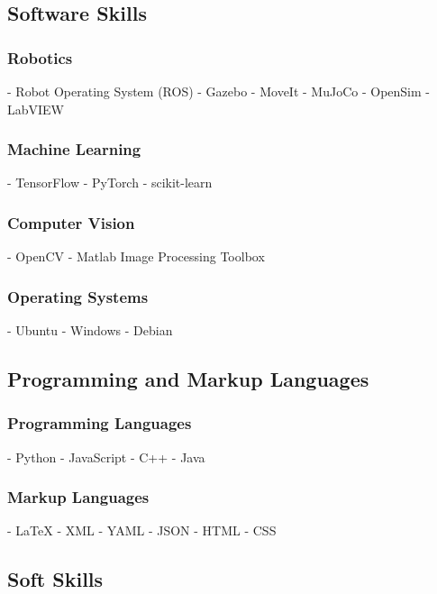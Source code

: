 \documentclass[a4paper]{article}
\begin{document}
\subsection{Software Skills}
        
\subsubsection{Robotics}
- Robot Operating System (ROS)
- Gazebo
- MoveIt
- MuJoCo
- OpenSim
- LabVIEW
    
\subsubsection{Machine Learning}
- TensorFlow
- PyTorch
- scikit-learn
    
\subsubsection{Computer Vision}
- OpenCV
- Matlab Image Processing Toolbox
    
\subsubsection{Operating Systems}
- Ubuntu
- Windows
- Debian
    
    
\subsection{Programming and Markup Languages}
        
\subsubsection{Programming Languages}
- Python
- JavaScript
- C++
- Java
    
\subsubsection{Markup Languages}
- {\LaTeX}
- XML
- YAML
- JSON
- HTML
- CSS
    
\subsection{Soft Skills}
        
\end{document}
